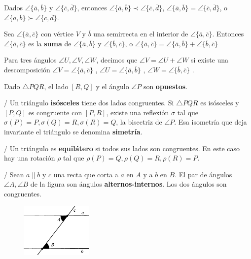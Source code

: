  Dados  $\angle \{\overline{a}, \overline{b} \}$ y  $\angle \{\overline{c}, \overline{d} \}$, entonces  $\angle \{\overline{a}, \overline{b}\} \prec \angle \{\overline{c}, \overline{d} \}$,  $\angle \{\overline{a}, \overline{b}\} = \angle \{\overline{c}, \overline{d} \}$, o  $\angle \{\overline{a}, \overline{b}\} \succ \angle \{\overline{c}, \overline{d} \}$.

 Sea  $\angle \{\overline{a}, \overline{c} \}$ con vértice $V$ y $\overline{b}$ una semirrecta en el interior de $\angle \{\overline{a}, \overline{c} \}$. Entonces $\angle \{\overline{a}, \overline{c} \}$ es la \textbf{suma} de $\angle \{\overline{a}, \overline{b} \}$ y $\angle \{\overline{b}, \overline{c} \}$, o $\angle \{\overline{a}, \overline{c} \}=\angle \{\overline{a}, \overline{b} \}+\angle \{\overline{b}, \overline{c} \}$

 Para tres ángulos $\angle U, \angle V, \angle W$, decimos que $\angle V = \angle U  + \angle W$ si existe una descomposición $\angle V = \angle \{\overline{a}, \overline{c} \}$ ,  $\angle U = \angle \{\overline{a}, \overline{b} \}$ ,  $\angle W = \angle \{\overline{b}, \overline{c} \}$ .

 Dado $\triangle PQR$, el lado $[R, Q]$ y el ángulo $\angle P$ son \textbf{opuestos}.

 /  Un triángulo \textbf{isósceles} tiene dos lados congruentes. Si $\triangle PQR$ es isósceles y $[P,Q]$ es congruente con $[P,R]$, existe una reflexión $\sigma$ tal que $\sigma(P) = P, \sigma(Q) = R, \sigma(R) = Q$, la bisectriz de $\angle P$. Esa isometría que deja invariante el triángulo se denomina \textbf{simetría}.

 /  Un triángulo es \textbf{equilátero} si todos sus lados son congruentes. En este caso hay una rotación $\rho$ tal que $\rho(P) = Q, \rho(Q) = R, \rho(R) = P$.

 /  Sean $a \parallel b$ y $c$ una recta que corta a $a$ en $A$ y a $b$ en $B$. El par de ángulos $\angle A, \angle B$ de la figura son ángulos \textbf{alternos-internos}.
Los dos ángulos son congruentes.
\begin{figure}[H]
	\centering
	\includegraphics[width=3.5cm]{figuras/4-40.png}
	\vspace{-1em}
\end{figure}

